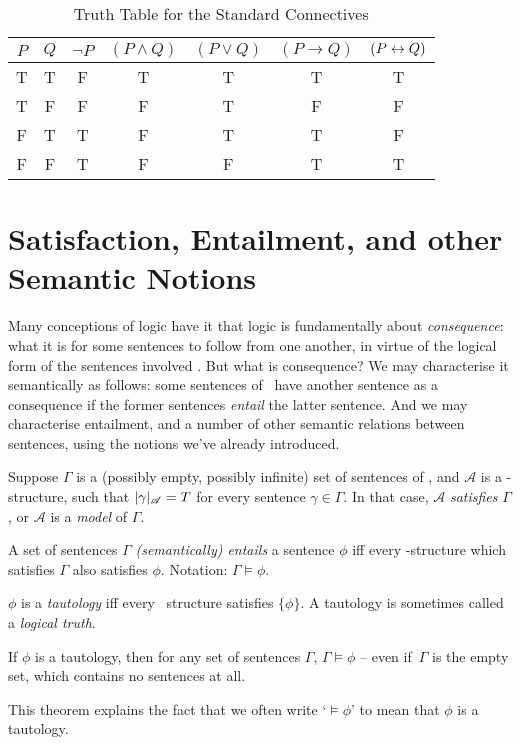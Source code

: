 \begin{table}[t]
	\centering
	\begin{tabular}{cc|ccccc}
\toprule
$P$ & $Q$ & $\neg P$ & $(P\wedge Q)$ & $(P\vee Q)$ & $(P \to Q)$ & $(P\leftrightarrow Q)$	\\
\midrule
T & T & F & T & T & T & T \\
T & F & F & F & T & F & F \\
F & T & T & F & T & T & F \\
F & F & T & F & F & T & T \\
\bottomrule
	\end{tabular}
	\caption{Truth Table for the Standard Connectives\label{tt}}
\end{table}


\section{Satisfaction, Entailment, and other Semantic Notions}

Many conceptions of logic have it that logic is fundamentally about \emph{consequence}: what it is for some sentences to follow from one another, in virtue of the logical form of the sentences involved \citep{brlc}. But what is consequence? We may characterise it semantically as follows: some sentences of \lone\ have another sentence as a consequence if the former sentences \emph{entail} the latter sentence. And we may characterise entailment, and a number of other semantic relations between sentences, using the notions we've already introduced.
\begin{definition}[Satisfaction]
	Suppose $\Gamma$ is a (possibly empty, possibly infinite) set of sentences of \lone, and $\mathscr{A}$ is a \lone-structure, such that $|\gamma|_{\mathscr{A}}=T$ for every sentence $\gamma\in\Gamma$. In that case, $\mathscr{A}$ \emph{satisfies} $\Gamma$, or $\mathscr{A}$ is a \emph{model} of $\Gamma$.	
	\end{definition}
\begin{definition}[Entailment]
	A set of sentences $\Gamma$ \emph{(semantically) entails} a sentence $\phi$ iff every \lone-structure which satisfies $\Gamma$ also satisfies $\phi$. Notation: $\Gamma \vDash \phi$.
\end{definition}
\begin{definition}[Tautology]		
	$\phi$ is a \emph{tautology} iff every \lone\ structure satisfies $\{\phi\}$. A tautology is sometimes called a \emph{logical truth}. 
\end{definition}
\begin{theorem}
	If $\phi$ is a tautology, then for any set of sentences $\Gamma$, $\Gamma \vDash \phi$ – even if \,$\Gamma$ is the empty set, which contains no sentences at all.
\end{theorem}
This theorem explains the fact that we often write `$\vDash \phi$' to mean that $\phi$ is a tautology.

